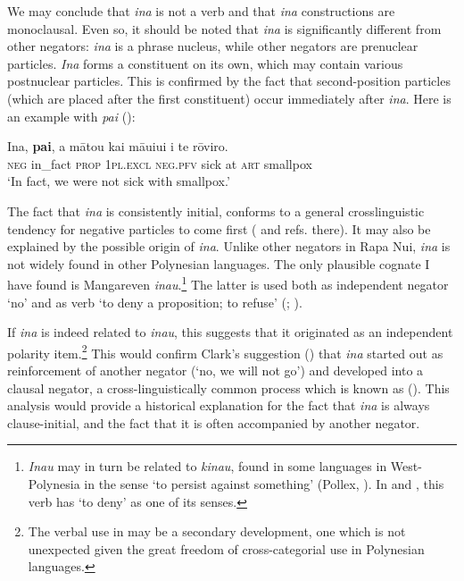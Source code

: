 We may conclude that \textit{{\ꞌ}ina} is not a verb and that \textit{{\ꞌ}ina} constructions are monoclausal. Even so, it should be noted that \textit{{\ꞌ}ina} is significantly different from other negators: \textit{{\ꞌ}ina} is a phrase nucleus, while other negators are prenuclear particles. \textit{{\ꞌ}Ina} forms a constituent on its own, which may contain various postnuclear particles. This is confirmed by the fact that second-position particles (which are placed after the first constituent) occur immediately after \textit{{\ꞌ}ina}. Here is an example with \textit{pa{\ꞌ}i} ():

\ea\label{ex:10.114}
\gll {\ꞌ}Ina, \textbf{pa{\ꞌ}i}, a mātou kai māuiui {\ꞌ}i te rōviro. \\
\textsc{neg} in\_fact \textsc{prop} \textsc{1pl.excl} \textsc{neg.pfv} sick at \textsc{art} smallpox \\

\glt
‘In fact, we were not sick with smallpox.’ \textstyleExampleref{[R539-1.680]}
\z

The fact that \textit{{\ꞌ}ina} is consistently initial, conforms to a general crosslinguistic tendency for negative particles to come first (\citealt[560]{Miestamo2007} and refs. there). It may also be explained by the possible origin of \textit{{\ꞌ}ina}. Unlike other negators in Rapa Nui, \textit{{\ꞌ}ina} is not widely found in other Polynesian languages. The only plausible cognate I have found is Mangareven \textit{inau}.\footnote{\label{fn:495}\textit{Inau} may in turn be related to \textit{kinau}, found in some languages in West-Polynesia in the sense ‘to persist against something’ (Pollex, \citealt{GreenhillClark2011}). In  and , this verb has ‘to deny’ as one of its senses.} The latter is used both as independent negator ‘no’ and as verb ‘to deny a proposition; to refuse’ (\citealt[24]{Tregear2009}; \citealt[83]{Rensch1991}).

If \textit{{\ꞌ}ina} is indeed related to  \textit{inau}, this suggests that it originated as an independent polarity item.\footnote{\label{fn:496}The verbal use in  may be a secondary development, one which is not unexpected given the great freedom of cross-categorial use in Polynesian languages.} This would confirm Clark’s suggestion (\citealt[104]{Clark1976}) that \textit{{\ꞌ}ina} started out as reinforcement of another negator (‘no, we will not go’) and developed into a clausal negator, a cross-linguistically common process which is known as  (\citealt[566]{Miestamo2007}). This analysis would provide a historical explanation for the fact that \textit{{\ꞌ}ina} is always clause-initial, and the fact that it is often accompanied by another negator. 
